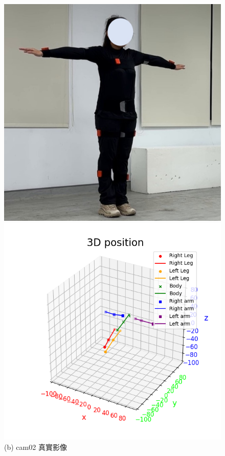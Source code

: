 \begin{figure}[!ht]
\begin{minipage}{.5\textwidth}
      \centering
      \includegraphics[width=.95\linewidth]{figure/ch4_fig_tpose_cam02_with2.jpg}
      \caption*{(b) cam02 真實影像}
   \end{minipage}
   \begin{minipage}{.5\textwidth}
      \centering
      \includegraphics[width=.95\linewidth]{figure/ch4_fig_tpose_result_with2.png}

\end{minipage}
\end{figure}

